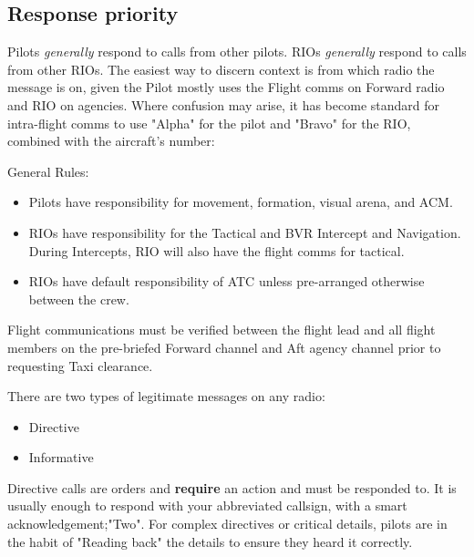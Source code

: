 \subsection{Response priority}

Pilots \textit{generally} respond to calls from other pilots. RIOs
\textit{generally} respond to calls from other RIOs. The easiest way to discern
context is from which radio the message is on, given the Pilot mostly uses the
Flight comms on Forward radio and RIO on agencies. Where confusion may arise, it
has become standard for intra-flight comms to use "Alpha" for the pilot and
"Bravo" for the RIO, combined with the aircraft's number:


General Rules:

\begin{itemize}

 \item Pilots have responsibility for movement, formation, visual arena, and
 ACM.

 \item RIOs have responsibility for the Tactical and BVR Intercept and
 Navigation. During Intercepts, RIO will also have the flight comms for
 tactical.

 \item RIOs have default responsibility of ATC unless pre-arranged
 otherwise between the crew.

\end{itemize}

Flight communications must be verified between the flight lead and all
flight members on the pre-briefed Forward channel and Aft agency channel prior
to requesting Taxi clearance.

There are two types of legitimate messages on any radio:

\begin{itemize}
 \item Directive
 \item Informative
\end{itemize}

Directive calls are orders and \textbf{require} an action and must be responded
to. It is usually enough to respond with your abbreviated callsign, with a smart
acknowledgement;"Two". For complex directives or critical details, pilots are in
the habit of "Reading back" the details to ensure they heard it correctly.

